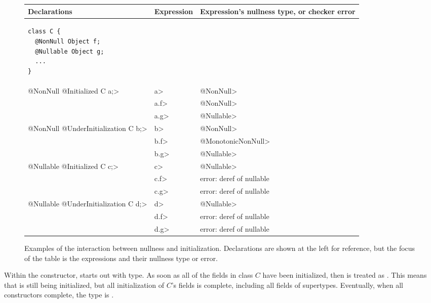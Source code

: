 \begin{figure}
\begin{tabular}{l|l|l}
Declarations & Expression & Expression's nullness type, or checker error \\ \hline
\begin{minipage}{1.5in}
\begin{Verbatim}
class C {
  @NonNull Object f;
  @Nullable Object g;
  ...
}
\end{Verbatim}
\end{minipage} & & \\ \cline{2-3}
\<@NonNull @Initialized C a;>
& \<a> & \<@NonNull> \\
& \<a.f> & \<@NonNull> \\
& \<a.g> & \<@Nullable> \\ \cline{2-3}
\<@NonNull @UnderInitialization C b;>
& \<b> & \<@NonNull> \\
& \<b.f> & \<@MonotonicNonNull> \\
& \<b.g> & \<@Nullable> \\ \cline{2-3}
\<@Nullable @Initialized C c;>
& \<c> & \<@Nullable> \\
& \<c.f> & error: deref of nullable \\
& \<c.g> & error: deref of nullable \\ \cline{2-3}
\<@Nullable @UnderInitialization C d;>
& \<d> & \<@Nullable> \\
& \<d.f> & error: deref of nullable \\
& \<d.g> & error: deref of nullable \\
\end{tabular}
\caption{Examples of the interaction between nullness and initialization.
  Declarations are shown at the left for reference, but the focus of the
  table is the expressions and their nullness type or error.}
\label{fig-initialization-examples}
\end{figure}





Within the constructor,
 starts out with  type.
As soon as all of the  fields
in class $C$ have been initialized, then  is treated as
.
This means that  is still being initialized, but all
initialization of $C$'s fields is complete, including all fields of supertypes.
Eventually, when all constructors complete, the type is
.

